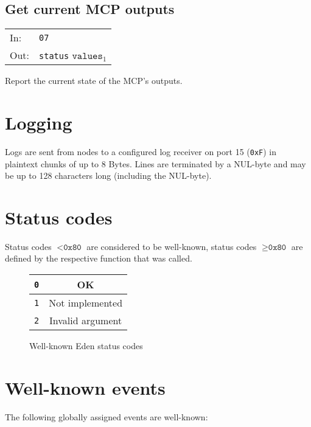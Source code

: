 \documentclass[a4paper]{scrartcl}
\newcommand{\EDEN}{{\sc Eden}}
\begin{document}
\subsection{Get current MCP outputs}
\begin{tabular}{ll}
  In: & \texttt{07} \\
  Out: & \texttt{status} $\texttt{values}_1$
\end{tabular}
\vspace{5pt}

Report the current state of the MCP's outputs.

\section{Logging}

Logs are sent from nodes to a configured log receiver on port 15 (\texttt{0xF}) in plaintext chunks
of up to 8 Bytes. Lines are terminated by a NUL-byte and may be up to 128 characters
long (including the NUL-byte).

\section{Status codes}

Status codes $< \texttt{0x80}$ are considered to be well-known,
status codes $\geq \texttt{0x80}$ are defined by the respective
function that was called.


\begin{figure}[h]
  \centering
  \begin{tabular}{|c|c|}
    \hline
    \texttt{0} & OK \\
    \hline
    \texttt{1} & Not implemented \\
    \hline
    \texttt{2} & Invalid argument \\
    \hline
  \end{tabular}
  
  \caption{Well-known \EDEN{} status codes}
\label{fig:eden-codes}
\end{figure}

\section{Well-known events}

The following globally assigned events are well-known:
\end{document}
